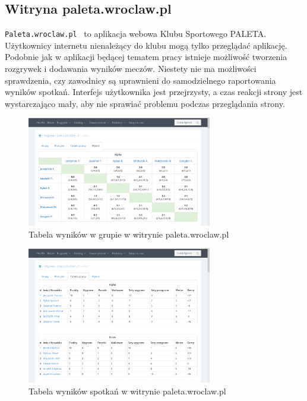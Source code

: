 \documentclass[shortabstract]{iithesis}
\begin{document}
\subsection{Witryna paleta.wroclaw.pl}
\texttt{Paleta.wroclaw.pl}~\cite{PaletaWroclaw} to aplikacja webowa Klubu Sportowego PALETA.
Użytkownicy internetu nienależący do klubu mogą tylko przeglądać aplikację.
Podobnie jak w aplikacji będącej tematem pracy istnieje możliwość tworzenia rozgrywek i dodawania wyników meczów.
Niestety nie ma możliwości sprawdzenia, czy zawodnicy są uprawnieni do samodzielnego raportowania wyników spotkań.
Interfejs użytkownika jest przejrzysty, a czas reakcji strony jest wystarczająco mały, aby nie sprawiać problemu podczas przeglądania strony.
\begin{figure}[H]
    \centering
    \includegraphics[width=0.72\textwidth,valign=t]{assets/alt_rozw/paleta_wyniki.png}
    \caption{Tabela wyników w grupie w witrynie paleta.wroclaw.pl}
\end{figure}
\begin{figure}[H]
    \centering
    \includegraphics[width=0.72\textwidth,valign=t]{assets/alt_rozw/paleta_tabela.png}
    \caption{Tabela wyników spotkań w witrynie paleta.wroclaw.pl}
\end{figure}
\end{document}
